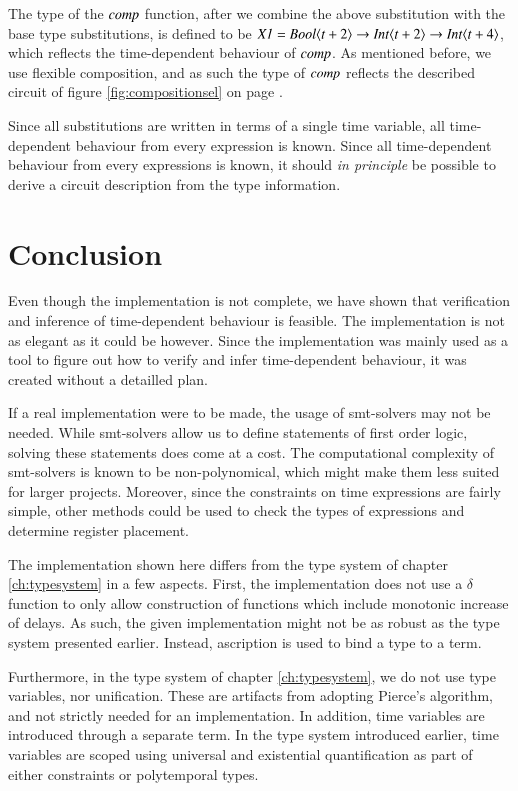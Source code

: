 The type of the \ensuremath{\Varid{comp}} function, after we combine the above substitution with the base type substitutions, is defined to be \ensuremath{\Conid{X1}\mathrel{=}\Conid{Bool}\langle\Varid{t}\mathbin{+}\mathrm{2}\rangle\to \Conid{Int}\langle\Varid{t}\mathbin{+}\mathrm{2}\rangle\to \Conid{Int}\langle\Varid{t}\mathbin{+}\mathrm{4}\rangle}, which reflects the time-dependent behaviour of \ensuremath{\Varid{comp}}.
As mentioned before, we use flexible composition, and as such the type of \ensuremath{\Varid{comp}} reflects the described circuit of figure \ref{fig:compositionsel} on page \pageref{fig:compositionsel}.

Since all substitutions are written in terms of a single time variable, all time-dependent behaviour from every expression is known.
Since all time-dependent behaviour from every expressions is known, it should \textit{in principle} be possible to derive a circuit description from the type information.

\section{Conclusion}
Even though the implementation is not complete, we have shown that verification and inference of time-dependent behaviour is feasible.
The implementation is not as elegant as it could be however.
Since the implementation was mainly used as a tool to figure out how to verify and infer time-dependent behaviour, it was created without a detailled plan.

If a real implementation were to be made, the usage of \gls{smt}-solvers may not be needed.
While \gls{smt}-solvers allow us to define statements of first order logic, solving these statements does come at a cost.
The computational complexity of \gls{smt}-solvers is known to be non-polynomical, which might make them less suited for larger projects.
Moreover, since the constraints on time expressions are fairly simple, other methods could be used to check the types of expressions and determine register placement. 

The implementation shown here differs from the type system of chapter \ref{ch:typesystem} in a few aspects.
First, the implementation does not use a $\delta$ function to only allow construction of functions which include monotonic increase of delays.
As such, the given implementation might not be as robust as the type system presented earlier.
Instead, ascription is used to bind a type to a term.

Furthermore, in the type system of chapter \ref{ch:typesystem}, we do not use type variables, nor unification.
These are artifacts from adopting Pierce's algorithm, and not strictly needed for an implementation.
In addition, time variables are introduced through a separate term.
In the type system introduced earlier, time variables are scoped using universal and existential quantification as part of either constraints or polytemporal types.


